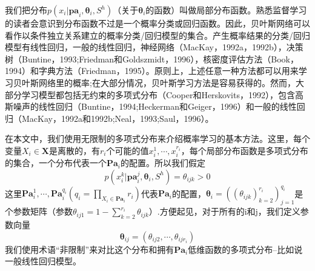\documentclass[10pt,a4paper]{article}
\begin{document}
\begin{CJK*}{UTF8}{gkai}
我们把分布$p(x_i|\boldsymbol{pa}_i,\boldsymbol{\theta}_i,S^h)$（关于$\boldsymbol{\theta}_i$的函数）叫做局部分布函数。熟悉监督学习的读者会意识到分布函数不过是一个概率分类或回归函数。因此，贝叶斯网络可以看作以条件独立关系建立的概率分类/回归模型的集合。产生概率结果的分类/回归模型有线性回归，一般的线性回归，神经网络（MacKay，1992a，1992b），决策树（Buntine，1993;Friedman和Goldszmidt，1996），核密度评估方法（Book，1994）和字典方法（Friedman，1995）。原则上，上述任意一种方法都可以用来学习贝叶斯网络里的概率;在大部分情况，贝叶斯学习方法是容易获得的。然而，大部分学习模型都包括无约束的多项式分布（Cooper和Herskovits，1992），包含高斯噪声的线性回归（Buntine，1994;Heckerman和Geiger，1996）和一般的线性回归（MacKay，1992a和1992b;Neal，1993;Saul，1996）。


在本文中，我们使用无限制的多项式分布来介绍概率学习的基本方法。这里，每个变量$X_i \in \boldsymbol{X}$是离散的，有$r_i$个可能的值$x_i^1,\cdots,x_i^{r_i}$，每个局部分布函数是多项式分布的集合，一个分布代表一个$\boldsymbol{Pa}_i$的配置。所以我们假定
\begin{equation}
\label{eq:24}
p(x_i^k|\boldsymbol{pa}_i^j,\boldsymbol{\theta}_i,S^h)=\theta_{ijk} >0
\end{equation}
这里$\boldsymbol{Pa}_i^1,\cdots,\boldsymbol{Pa}_i^{q_i}(q_i=\prod_{X_i \in \boldsymbol{Pa}_i} r_i)$代表$\boldsymbol{Pa}_i$的配置，$\boldsymbol{\theta}_i=((\theta_{ijk})_{k=2}^{r_i})_{j=1}^{q_i}$是个参数矩阵（参数$\theta_{ij1}=1-\sum_{k=2}^{r_i}\theta_{ijk}$）.方便起见，对于所有的i和j，我们定义参数向量
\begin{equation}
\boldsymbol{\theta}_{ij}=(\theta_{ij2},\cdots,\theta_{ijr_i})	\nonumber
\end{equation}
我们使用术语“非限制”来对比这个分布和拥有$\boldsymbol{Pa}_i$低维函数的多项式分布--比如说一般线性回归模型。



\end{CJK*}
\end{document}
